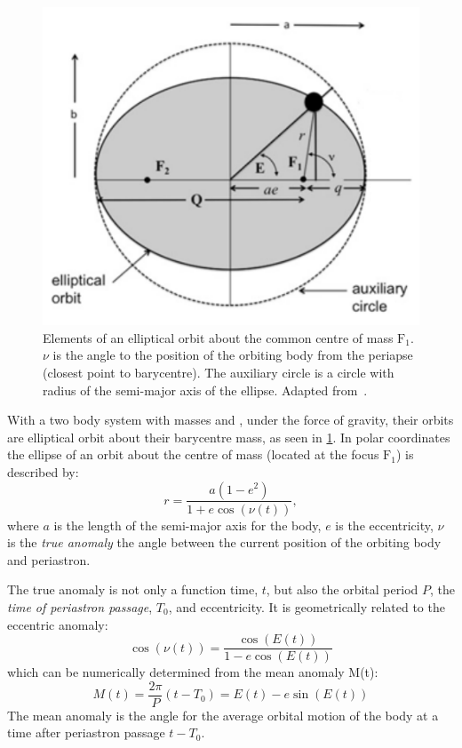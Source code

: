 \begin{figure}
    \centering
    \includegraphics[width=0.7\linewidth]{figures/fundamental_rv/eclipes_orbit2}
    \caption{Elements of an elliptical orbit about the common centre of mass \(\textrm{F}_1\). {\(\nu\)} is the angle to the position of the orbiting body from the periapse (closest point to barycentre). The auxiliary circle is a circle with radius of the semi-major axis of the ellipse. Adapted from~\citep{bozza_methods_2016}.}
    \label{fig:eclipesorbit}
\end{figure}

With a two body system with masses \Mone{} and \Mtwo{}, under the force of gravity, their orbits are elliptical orbit about their barycentre mass, as seen in \cref{fig:eclipesorbit}.
In polar coordinates the ellipse of an orbit about the centre of mass (located at the focus $\textrm{F}_1$) is described by:
\begin{equation}
    r = \frac{a(1-e^{2})}{1 + e \cos(\nu(t))},
\end{equation}
where $a$ is the length of the semi-major axis for the body, $e$ is the eccentricity, $\nu$ is the \emph{true anomaly} the angle between the current position of the orbiting body and periastron.

The true anomaly is not only a function time, \(t\), but also the orbital period \(P\), the \emph{time of periastron passage}, \(T_0\), and eccentricity.
It is geometrically related to the eccentric anomaly:
\begin{equation}
\cos(\nu(t)) = \frac{\cos(E(t))}{1 - e \cos(E(t))}
\end{equation} 
which can be numerically determined from the mean anomaly M(t):
\begin{equation}
M(t) = \frac{2 \pi}{P}(t - T_0) = E(t) - e \sin(E(t))
\end{equation}
The mean anomaly is the angle for the average orbital motion of the body at a time after periastron passage \(t-T_0\).



